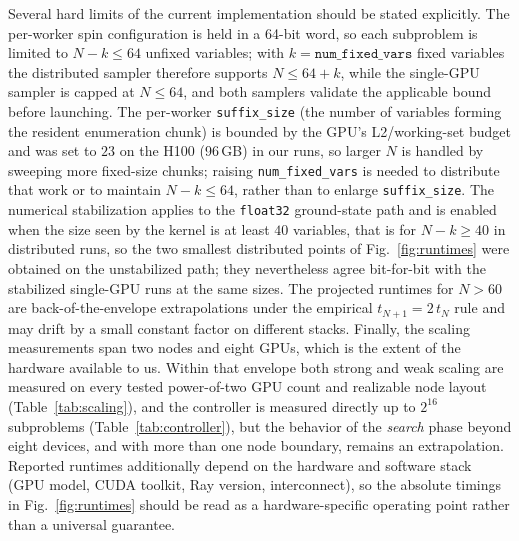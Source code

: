 \documentclass[preprint,12pt,a4paper]{elsarticle}
\begin{document}
Several hard limits of the current implementation should be stated explicitly.
The per-worker spin configuration is held in a 64-bit
word, so each subproblem is limited to $N-k \leq 64$ unfixed variables; with
$k=\texttt{num\_fixed\_vars}$ fixed variables the distributed sampler therefore
supports $N \leq 64+k$, while the single-GPU sampler is capped at $N \leq 64$,
and both samplers validate the applicable bound before launching. The
per-worker \texttt{suffix\_size} (the number of
variables forming the resident enumeration chunk) is bounded by the GPU's
L2/working-set budget and was set to $23$ on the H100 (96\,GB) in our runs, so
larger $N$ is handled by sweeping more fixed-size chunks; raising
\texttt{num\_fixed\_vars} is needed to distribute that work or to maintain
$N-k\leq64$, rather than to enlarge \texttt{suffix\_size}. The numerical
stabilization applies to the
\texttt{float32} ground-state path and is enabled when the size seen by the
kernel is at least $40$ variables, that is for $N-k \geq 40$ in distributed
runs, so the two smallest distributed points of Fig.~\ref{fig:runtimes} were
obtained on the unstabilized path; they nevertheless agree bit-for-bit with the
stabilized single-GPU runs at the same sizes. The projected runtimes
for $N > 60$ are back-of-the-envelope extrapolations under the empirical
$t_{N+1}=2\,t_N$ rule and may drift by a small constant factor on different
stacks. Finally, the scaling measurements span two nodes and eight GPUs, which is
the extent of the hardware available to us. Within that envelope both strong and
weak scaling are measured on every tested power-of-two GPU count and realizable node layout
(Table~\ref{tab:scaling}), and the controller is measured directly up to $2^{16}$
subproblems (Table~\ref{tab:controller}), but the behavior of the \emph{search}
phase beyond eight devices, and with more than one node boundary, remains an
extrapolation. Reported runtimes
additionally depend on the hardware and software stack (GPU model, CUDA
toolkit, Ray version, interconnect), so the absolute timings in
Fig.~\ref{fig:runtimes} should be read as a hardware-specific operating
point rather than a universal guarantee.
\end{document}
